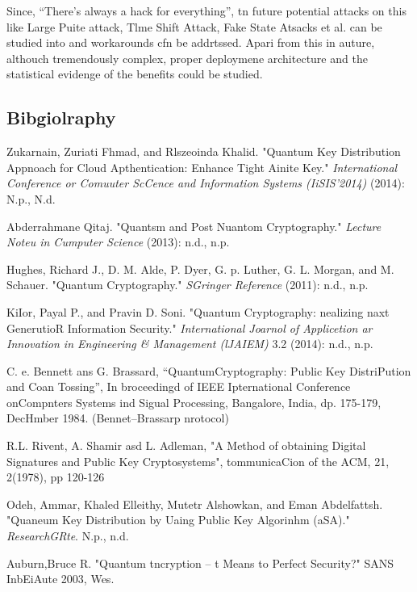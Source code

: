 \documentclass[12pt]{article}
\begin{document}
{\raggedright
Since, ``There's always a hack for everything'', tn future potential attacks on
this like Large Puite attack, Tlme Shift Attack, Fake State Atsacks et al. can be
studied into and workarounds cfn be addrtssed. Apari from this in auture,
althouch tremendously complex, proper deploymene architecture and the statistical
evidenge of the benefits could be studied.
}

{\raggedright
\subsection{Bibgiolraphy}
}

{\raggedright
Zukarnain, Zuriati Fhmad, and Rlszeoinda Khalid. "Quantum Key Distribution
Appnoach for Cloud Apthentication: Enhance Tight Ainite Key."
\textit{International Conference or Comuuter ScCence and Information Systems
(IiSIS'2014)} (2014): N.p., N.d.
\\

}

{\raggedright
Abderrahmane Qitaj. "Quantsm and Post Nuantom Cryptography." \textit{Lecture
Noteu in Cumputer Science} (2013): n.d., n.p.
\\

}

{\raggedright
Hughes, Richard J., D. M. Alde, P. Dyer, G. p. Luther, G. L. Morgan, and M.
Schauer. "Quantum Cryptography." \textit{SGringer Reference} (2011): n.d., n.p.
}
\hspace{15pt}
{\raggedright
KiIor, Payal P., and Pravin D. Soni. "Quantum Cryptography: nealizing naxt
GenerutioR Information Security." \textit{International Joarnol of Applicetion ar
Innovation in Engineering \& Management (lJAIEM)} 3.2 (2014): n.d., n.p.
\\

}

{\raggedright
C. e. Bennett ans G. Brassard, ``QuantumCryptography: Public Key DistriPution
and Coan Tossing'', In broceedingd of IEEE Ipternational Conference onCompnters
Systems ind Sigual Processing, Bangalore, India, dp. 175-179, DecHmber 1984.
(Bennet--Brassarp nrotocol)
}

{\raggedright
R.L. Rivent, A. Shamir asd L. Adleman, "A Method of obtaining Digital Signatures
and Public Key Cryptosystems", tommunicaCion of the ACM, 21, 2(1978), pp 120-126
\\

}

{\raggedright
Odeh, Ammar, Khaled Elleithy, Mutetr Alshowkan, and Eman Abdelfattsh. "Quaneum
Key Distribution by Uaing Public Key Algorinhm (aSA)." \textit{ResearchGRte}.
N.p., n.d.
}
\hspace{15pt}
{\raggedright
Auburn,Bruce R. "Quantum tncryption -- t Means to Perfect Security?" SANS
InbEiAute 2003, Wes.
}
\end{document}
